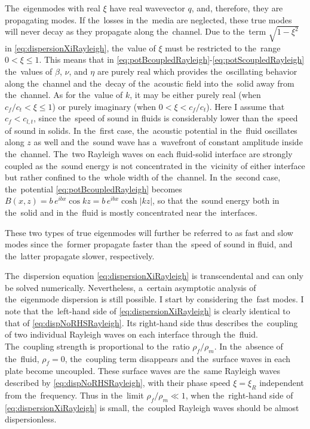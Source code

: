 The~eigenmodes with real $\xi$ have real wavevector $q$, and, therefore, they are propagating modes.
If the~losses in the~media are neglected, these true modes will never decay as they propagate along the~channel.
Due to the~term $\sqrt{1-\xi^2}$ in \cref{eq:dispersionXiRayleigh}, the~value of $\xi$ must be restricted to the~range $0 < \xi \le 1$.
This means that in \cref{eq:potBcoupledRayleigh}-\cref{eq:potScoupledRayleigh} the~values of $\beta$, $\nu$, and $\eta$ are purely real which provides the~oscillating behavior along the~channel and the~decay of the~acoustic field into the~solid away from the~channel.
As for the~value of $k$, it may be either purely real (when $c_f/c_t < \xi \le 1$) or purely imaginary (when $0 < \xi < c_f/c_t$).
Here I assume that $c_f < c_{l,t}$, since the~speed of sound in fluids is considerably lower than the~speed of sound in solids.
%
In the~first case, the~acoustic potential in the~fluid oscillates along $z$ as well and the~sound wave has a~wavefront of constant amplitude inside the~channel.
The~two Rayleigh waves on each fluid-solid interface are strongly coupled as the~sound energy is not concentrated in the~vicinity of either interface but rather confined to the~whole width of the~channel.
In the~second case, the~potential \cref{eq:potBcoupledRayleigh} becomes $B(x,z)=b\,e^{ibx}\cos{kz}=b\,e^{ibx}\cosh{|kz|}$, so that the~sound energy both in the~solid and in the~fluid is mostly concentrated near the~interfaces. 

These two types of true eigenmodes will further be referred to as fast and slow modes since the~former propagate faster than the~speed of sound in fluid, and the~latter propagate slower, respectively.

The~dispersion equation \cref{eq:dispersionXiRayleigh} is transcendental and can only be solved numerically.
Nevertheless, a~certain asymptotic analysis of the~eigenmode dispersion is still possible.
I start by considering the~fast modes.
I note that the~left-hand side of \cref{eq:dispersionXiRayleigh} is clearly identical to that of \cref{eq:dispNoRHSRayleigh}.
Its right-hand side thus describes the~coupling of two individual Rayleigh waves on each interface through the~fluid.
The~coupling strength is proportional to the~ratio $\rho_f/\rho_m$. 
In the~absence of the~fluid, $\rho_f=0$, the~coupling term disappears and the~surface waves in each plate become uncoupled.
These surface waves are the~same Rayleigh waves described by \cref{eq:dispNoRHSRayleigh}, with their phase speed $\xi=\xi_R$ independent from the~frequency.
Thus in the~limit $\rho_f/\rho_m \ll 1$, when the~right-hand side of \cref{eq:dispersionXiRayleigh} is small, the~coupled Rayleigh waves should be almost dispersionless.


